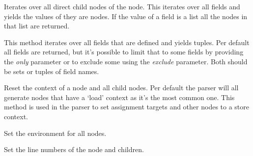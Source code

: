 \documentclass[a4paper,10pt,english]{sphinxmanual}
\begin{document}
\begin{fulllineitems}
\begin{fulllineitems}
\label{extensions:jinja2.nodes.Node.iter_child_nodes}
Iterates over all direct child nodes of the node.  This iterates
over all fields and yields the values of they are nodes.  If the value
of a field is a list all the nodes in that list are returned.

\end{fulllineitems}


\begin{fulllineitems}
\label{extensions:jinja2.nodes.Node.iter_fields}
This method iterates over all fields that are defined and yields
 tuples.  Per default all fields are returned, but
it's possible to limit that to some fields by providing the \emph{only}
parameter or to exclude some using the \emph{exclude} parameter.  Both
should be sets or tuples of field names.

\end{fulllineitems}


\begin{fulllineitems}
\label{extensions:jinja2.nodes.Node.set_ctx}
Reset the context of a node and all child nodes.  Per default the
parser will all generate nodes that have a `load' context as it's the
most common one.  This method is used in the parser to set assignment
targets and other nodes to a store context.

\end{fulllineitems}


\begin{fulllineitems}
\label{extensions:jinja2.nodes.Node.set_environment}
Set the environment for all nodes.

\end{fulllineitems}


\begin{fulllineitems}
\label{extensions:jinja2.nodes.Node.set_lineno}
Set the line numbers of the node and children.

\end{fulllineitems}


\end{fulllineitems}
\end{document}

